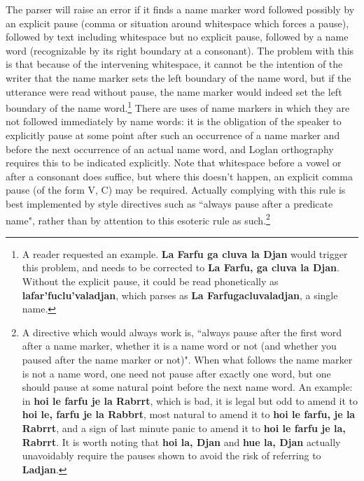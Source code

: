 \documentclass[12pt]{book}
\begin{document}
The parser will raise an error if it finds a name marker word followed possibly by an explicit pause (comma or situation around whitespace which forces a pause), followed by text including whitespace but no explicit pause, followed by a name word (recognizable by its right boundary at a consonant). The problem with this is that because of the intervening whitespace, it cannot be  the intention of the writer that the name marker sets the left boundary of the name word, but if the utterance were read without pause, the name marker would indeed set the left boundary of the name word.\footnote{A reader requested an example.  {\bf La Farfu ga cluva la Djan} would trigger this problem, and needs to be corrected to {\bf La Farfu, ga cluva la Djan}.  Without the explicit pause, it could be read phonetically as {\bf lafar'fuclu'valadjan}, which parses as {\bf La Farfugacluvaladjan}, a single name.}  There are uses of name markers in which they are not followed immediately by name words:  it is the obligation of the speaker to explicitly pause at some point after such
an occurrence of a name marker and before the next occurrence of an actual name word, and Loglan orthography requires this to be indicated explicitly.  Note that whitespace before a vowel or after a consonant does suffice, but where this doesn't happen, an explicit comma pause (of the form V, C) may be required.  Actually complying with this rule is best implemented by style directives such as ``always pause after a predicate name", rather than by attention to this esoteric rule as such.\footnote{A directive which would always work is, ``always pause after the first word after a name marker, whether it is a name word or not (and whether you paused after the name marker or not)".  When what follows the name marker is not a name word, one need not pause after exactly one word, but one should pause at some natural point before the next name word.  An example:  in {\bf hoi le farfu je la Rabrrt}, which is bad, it is legal but odd to amend it to {\bf hoi le, farfu je la Rabbrt}, most natural to amend it to {\bf hoi le farfu, je la Rabrrt}, and a sign of last minute panic to amend it to {\bf hoi le farfu je la, Rabrrt}.  It is worth noting that {\bf hoi la, Djan} and {\bf hue la, Djan} actually unavoidably require the pauses shown to avoid the risk of referring to {\bf Ladjan}.}
\end{document}
